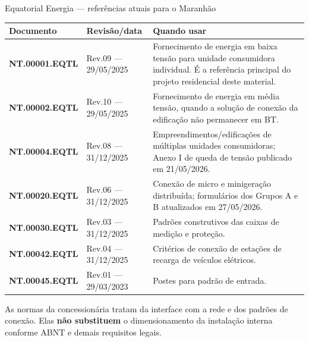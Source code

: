 \begin{frame}[shrink=5]{Equatorial Energia — referências atuais para o Maranhão}
\scriptsize
\begin{tabularx}{\textwidth}{>{\bfseries}p{2.65cm}p{2.15cm}X}
\toprule
Documento & Revisão/data & Quando usar \\
\midrule
NT.00001.EQTL & Rev.09 — 29/05/2025 & Fornecimento de energia em baixa tensão para unidade consumidora individual. É a referência principal do projeto residencial deste material. \\
NT.00002.EQTL & Rev.10 — 29/05/2025 & Fornecimento de energia em média tensão, quando a solução de conexão da edificação não permanecer em BT. \\
NT.00004.EQTL & Rev.08 — 31/12/2025 & Empreendimentos/edificações de múltiplas unidades consumidoras; Anexo I de queda de tensão publicado em 21/05/2026. \\
NT.00020.EQTL & Rev.06 — 31/12/2025 & Conexão de micro e minigeração distribuída; formulários dos Grupos A e B atualizados em 27/05/2026. \\
NT.00030.EQTL & Rev.03 — 31/12/2025 & Padrões construtivos das caixas de medição e proteção. \\
NT.00042.EQTL & Rev.04 — 31/12/2025 & Critérios de conexão de estações de recarga de veículos elétricos. \\
NT.00045.EQTL & Rev.01 — 29/03/2023 & Postes para padrão de entrada. \\
\bottomrule
\end{tabularx}
\begin{caixaAt}
As normas da concessionária tratam da interface com a rede e dos padrões de conexão. Elas \textbf{não substituem} o dimensionamento da instalação interna conforme ABNT e demais requisitos legais.
\end{caixaAt}
\end{frame}

